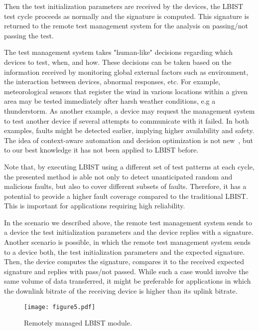 \documentclass[a4paper]{llncs}
\begin{document}
Then the test initialization parameters are received by the devices, the LBIST test cycle proceeds as normally and the signature is computed. This signature is returned to the remote test management system for the analysis on passing/not passing the test.


The test management system takes "human-like" decisions regarding which devices to test, when, and how. These decisions can be taken based on the information received  
by monitoring global external factors such as environment, the interaction between devices, abnormal responses, etc. For example, meteorological sensors that register the wind in various locations within a given area may be tested immediately after harsh weather conditions, e.g a thunderstorm. As another example, a device may request the management system to test another device if several attempts to communicate with it failed. In both examples, faults might be detected earlier, implying higher availability and safety.
The idea of context-aware automation and decision optimization is not new~\cite{WaD09}, but to our best knowledge it has not been applied to LBIST before.  

Note that, by executing LBIST using a different set of test patterns at each cycle, the presented method is able not only to detect unanticipated random and malicious faults, but also to cover different subsets of faults. Therefore, it has a potential to provide a higher fault coverage compared to the traditional LBIST. This is important for applications requiring high reliability.

In the scenario we described above, the remote test management system sends to a device the test initialization parameters and the device replies with a signature.  
Another scenario is possible, in which the remote test management system sends to a device both, the test initialization parameters and the expected signature. Then, the device computes the signature, compares it to the received expected signature and replies with pass/not passed. While such a case would involve the same volume of data transferred, it
might be preferable for applications in which the downlink bitrate of the receiving device is higher than its uplink bitrate.

\begin{figure}[t!]
\begin{center}
\texttt{[image: figure5.pdf]}
\caption{Remotely managed LBIST module.}\label{f6} 
\end{center}
\end{figure}
\end{document}
